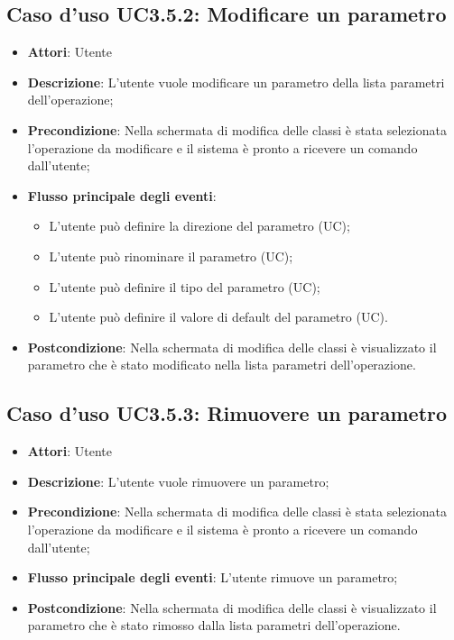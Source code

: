 \documentclass[../AnalisiDeiRequisiti.tex]{subfiles}
\begin{document}
		\subsection{Caso d'uso UC3.5.2: Modificare un parametro}
		\begin{itemize}
			\item \textbf{Attori}: Utente
			\item \textbf{Descrizione}: L'utente vuole modificare un parametro della lista parametri dell'operazione;
			\item \textbf{Precondizione}: Nella schermata di modifica delle classi è stata selezionata l'operazione da modificare e il sistema è pronto a ricevere un comando dall'utente;
			\item \textbf{Flusso principale degli eventi}: \begin{itemize} \item L'utente può definire la direzione del parametro (UC); \item L'utente può rinominare il parametro (UC); \item L'utente può definire il tipo del parametro (UC); \item L'utente può definire il valore di default del parametro (UC). \end{itemize}
				\item \textbf{Postcondizione}: Nella schermata di modifica delle classi è visualizzato il parametro che è stato modificato nella lista parametri dell'operazione.
			\end{itemize}
			\subsection{Caso d'uso UC3.5.3: Rimuovere un parametro}
			\begin{itemize}
				\item \textbf{Attori}: Utente
				\item \textbf{Descrizione}: L'utente vuole rimuovere un parametro;
				\item \textbf{Precondizione}: Nella schermata di modifica delle classi è stata selezionata l'operazione da modificare e il sistema è pronto a ricevere un comando dall'utente;
				\item \textbf{Flusso principale degli eventi}: L'utente rimuove un parametro;
				\item \textbf{Postcondizione}: Nella schermata di modifica delle classi è visualizzato il parametro che è stato rimosso dalla lista parametri dell'operazione.
			\end{itemize}
\end{document}
